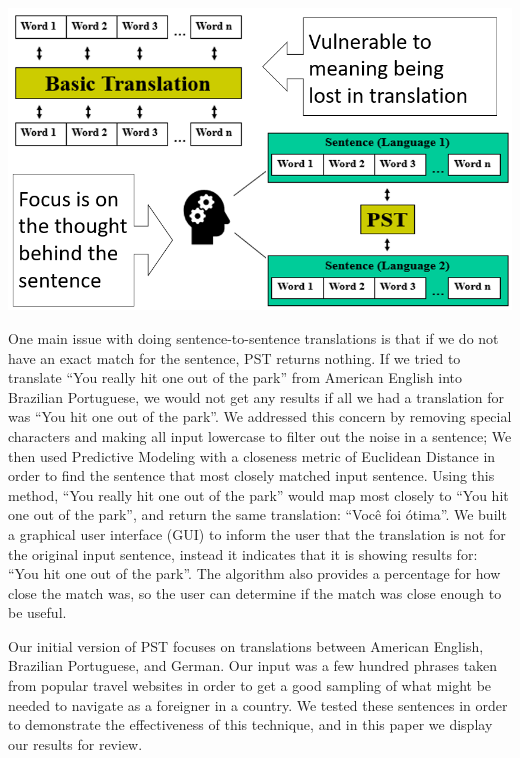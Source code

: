 \documentclass[runningheads]{llncs}
\begin{document}
	\begin{minipage}{\linewidth}
		\begin{center}
			\hspace*{-.5in}
			\includegraphics[width=\textwidth]{Pristine_Sentence_Translation_Visual.png}
			\label{fig:Pristine Sentence Translation High-Level Overview}
			\vspace*{1cm}
		\end{center}
	\end{minipage}
	\afterpage{\clearpage}

	One main issue with doing sentence-to-sentence translations is that if we do not have an exact match for the sentence, PST returns nothing. If we tried to translate ``You really hit one out of the park'' from American English into Brazilian Portuguese, we would not get any results if all we had a translation for was ``You hit one out of the park''. We addressed this concern by removing special characters and making all input lowercase to filter out the noise in a sentence; We then used Predictive Modeling with a closeness metric of Euclidean Distance in order to find the sentence that most closely matched input sentence. Using this method, ``You really hit one out of the park'' would map most closely to ``You hit one out of the park'', and return the same translation: ``Você foi ótima''. We built a graphical user interface (GUI) to inform the user that the translation is not for the original input sentence, instead it indicates that it is showing results for: ``You hit one out of the park''. The algorithm also provides a percentage for how close the match was, so the user can determine if the match was close enough to be useful.
	
	Our initial version of PST focuses on translations between American English, Brazilian Portuguese, and German. Our input was a few hundred phrases taken from popular travel websites in order to get a good sampling of what might be needed to navigate as a foreigner in a country. We tested these sentences in order to demonstrate the effectiveness of this technique, and in this paper we display our results for review. 
\end{document}
